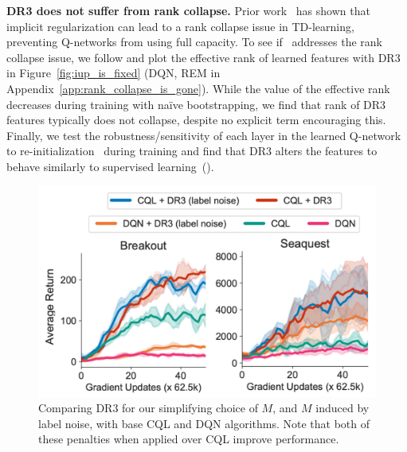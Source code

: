 \textbf{{{DR3 does not suffer from rank collapse.}}} Prior work~\citep{kumar2021implicit} has shown that implicit regularization can lead to a rank collapse issue in TD-learning, preventing Q-networks from using full capacity. To see if \drmethodname\ addresses the rank collapse issue, we follow \citet{kumar2021implicit} and plot the effective rank of learned features with DR3 in Figure~\ref{fig:iup_is_fixed} {(DQN, REM in Appendix~\ref{app:rank_collapse_is_gone})}. 
While the value of the effective rank decreases during training with na\"ive bootstrapping, {we find that rank of DR3 features typically does not collapse}, despite no explicit term encouraging this. 
Finally, we test the robustness/sensitivity of each layer in the learned Q-network to re-initialization~\citep{zhang2019all} during training and find that DR3 alters the features to behave similarly to supervised learning~().

\begin{figure}[t]
\small \begin{center}
\vspace{-0.2cm}
\includegraphics[width=0.6\linewidth]{chapters/dr3/figures_iclr/different_penalty.pdf}
\vspace{-10pt}
\caption{\label{fig:other_penalty_main} \footnotesize{Comparing  DR3 for our simplifying choice of $M$, and $M$ induced by label noise, {with base CQL and DQN algorithms}. Note that both of these penalties when applied over CQL improve performance.}}
\end{center}
\end{figure}

